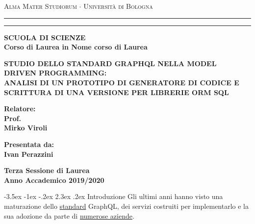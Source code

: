 \documentclass[a4paper, 12pt]{report}
\begin{document}
\begin{titlepage}
\begin{center}
{{\Large{\textsc{Alma Mater Studiorum $\cdot$ Universit\`a di
Bologna}}}} \rule[0.1cm]{15.8cm}{0.1mm}
\rule[0.5cm]{15.8cm}{0.6mm}
{\small{\bf SCUOLA DI SCIENZE\\
Corso di Laurea in Nome corso di Laurea }}
\end{center}
\vspace{15mm}
\begin{center}
\LARGE\textbf{STUDIO DELLO STANDARD GRAPHQL NELLA MODEL DRIVEN PROGRAMMING:\\\vspace{2.5mm}ANALISI DI UN PROTOTIPO DI GENERATORE DI CODICE E SCRITTURA DI UNA VERSIONE PER LIBRERIE ORM SQL}
\par
\end{center}
\vspace{40mm}
\noindent
\begin{minipage}[t]{0.47\textwidth}
{\large{\bf Relatore:\\
Prof.\\
Mirko Viroli}}
\end{minipage}
\hfill
\begin{minipage}[t]{0.47\textwidth}\raggedleft
{\large{\bf Presentata da:\\
Ivan Perazzini}}
\end{minipage}
\vspace{20mm}
\begin{center}
{\large{\bf Terza Sessione di Laurea\\%
Anno Accademico 2019/2020}}%
\end{center}
\end{titlepage}

\graphicspath{ {./} }
\setlength{\parindent}{0em}
\setcounter{secnumdepth}{0}
\makeatletter
\renewcommand\section{\@startsection{section}{1}{\z@}%
                                   {-3.5ex \@plus -1ex \@minus -.2ex}%
                                   {2.3ex \@plus.2ex}%
                                   {\normalfont\large\bfseries\center}}
    
  
  \section{Introduzione}
  Gli ultimi anni hanno visto una maturazione dello \href{http://spec.graphql.org/}{standard} GraphQL, dei servizi costruiti per implementarlo e la sua adozione da parte di \href{https://GraphQL.org/users/}{numerose aziende}.
  
\end{document}
